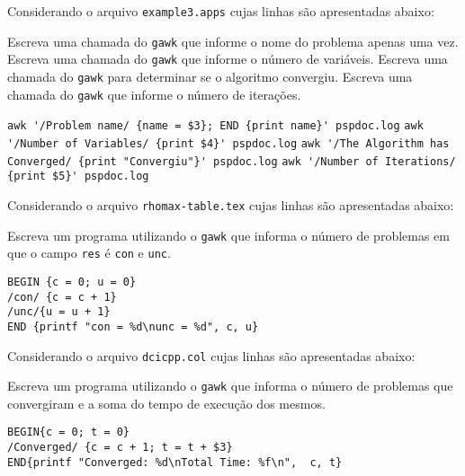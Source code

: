 \begin{Exercise}[label={0005}, difficulty={1}, origin={gawk}]
  Considerando o arquivo \lstinline+example3.apps+ cujas linhas são
  apresentadas abaixo:
  
    \Question Escreva uma chamada do \lstinline+gawk+ que informe o nome do
      problema apenas uma vez.
    \Question Escreva uma chamada do \lstinline+gawk+ que informe o número de
      variáveis.
    \Question Escreva uma chamada do \lstinline+gawk+ para determinar se o algoritmo
      convergiu.
    \Question Escreva uma chamada do \lstinline+gawk+ que informe o número de
      iterações.
\end{Exercise}
\begin{Answer}[ref={0005}]
    \Question \lstinline+awk '/Problem name/ {name = $3}; END {print name}' pspdoc.log+
    \Question \lstinline+awk '/Number of Variables/ {print $4}' pspdoc.log+
    \Question \lstinline+awk '/The Algorithm has Converged/ {print "Convergiu"}' pspdoc.log+
    \Question \lstinline+awk '/Number of Iterations/ {print $5}' pspdoc.log+
\end{Answer}

\begin{Exercise}[label={0006}, difficulty={2}, origin={gawk}]
  Considerando o arquivo \lstinline+rhomax-table.tex+ cujas linhas são
  apresentadas abaixo:
  
  Escreva um programa utilizando o \lstinline+gawk+ que informa o número de
  problemas em que o campo \lstinline+res+ é \lstinline+con+ e \lstinline+unc+.
\end{Exercise}
\begin{Answer}[ref={0006}]
  \begin{lstlisting}
BEGIN {c = 0; u = 0}
/con/ {c = c + 1}
/unc/{u = u + 1}
END {printf "con = %d\nunc = %d", c, u}
  \end{lstlisting}
\end{Answer}

\begin{Exercise}[label={0007}, difficulty={2}, origin={gawk}]
  Considerando o arquivo \lstinline+dcicpp.col+ cujas linhas são
  apresentadas abaixo:
  
  Escreva um programa utilizando o \lstinline+gawk+ que informa o número de
  problemas que convergiram e a soma do tempo de execução dos mesmos.
\end{Exercise}
\begin{Answer}[ref={007}]
  \begin{lstlisting}
BEGIN{c = 0; t = 0}
/Converged/ {c = c + 1; t = t + $3}
END{printf "Converged: %d\nTotal Time: %f\n",  c, t}
  \end{lstlisting}
\end{Answer}

